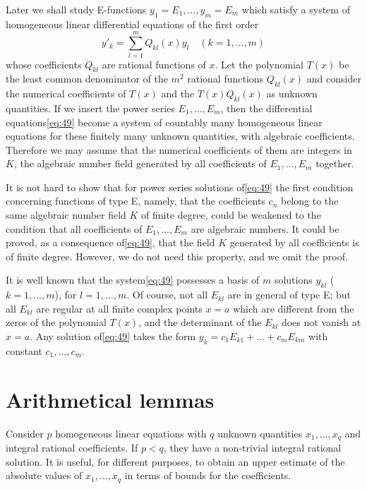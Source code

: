 Later we shall study E-functions $y_1 = E_1, \ldots, y_m = E_m$ which satisfy a system of homogeneous linear differential equations of the first order
\begin{equation}
y'_{k} = \sum_{l=1}^{m} Q_{kl}(x) y_{l} \quad (k=1,\ldots,m) \tag{49}\label{eq:49}
\end{equation}
whose coefficients $Q_{kl}$ are rational functions of $x$. Let the polynomial $T(x)$ be the least common denominator of the $m^2$ rational functions $Q_{kl}(x)$ and consider the numerical coefficients of $T(x)$ and the $T(x) Q_{kl}(x)$ as unknown quantities. If we insert the power series $E_1, \ldots, E_m$, then the differential equations\eqref{eq:49} become a system of countably many homogeneous linear equations for these finitely many unknown quantities, with algebraic coefficients. Therefore we may assume that the numerical coefficients of them are integers in $K$, the algebraic number field generated by all coefficients of $E_1, \ldots, E_m$ together.

It is not hard to show that for power series solutions of\eqref{eq:49} the first condition concerning functions of type E, namely, that the coefficients $c_n$ belong to the same algebraic number field $K$ of finite degree, could be weakened to the condition that all coefficients of $E_1, \ldots, E_m$ are algebraic numbers. It could be proved, as a consequence of\eqref{eq:49}, that the field $K$ generated by all coefficients is of finite degree. However, we do not need this property, and we omit the proof.

It is well known that the system\eqref{eq:49} possesses a basis of $m$ solutions $y_{kl}$ ($k=1,\ldots,m$), for $l=1,\ldots,m$. Of course, not all $E_{kl}$ are in general of type E; but all $E_{kl}$ are regular at all finite complex points $x=a$ which are different from the zeros of the polynomial $T(x)$, and the determinant of the $E_{kl}$ does not vanish at $x=a$. Any solution of\eqref{eq:49} takes the form $y_k = c_1 E_{k1} + \dots + c_m E_{km}$ with constant $c_1, \dots, c_m$.

\section{Arithmetical lemmas}

Consider $p$ homogeneous linear equations with $q$ unknown quantities $x_1, \ldots, x_q$ and integral rational coefficients. If $p < q$, they have a non-trivial integral rational solution. It is useful, for different purposes, to obtain an upper estimate of the absolute values of $x_1, \ldots, x_q$ in terms of bounds for the coefficients.

